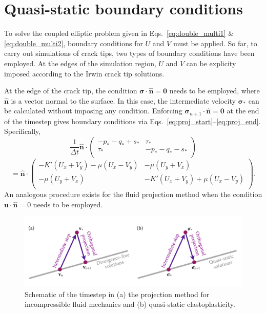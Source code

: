 \documentclass[11pt]{article}
\newcommand{\bsig}{\boldsymbol\sigma}
\renewcommand{\vec}[1]{\mathbf{#1}}
\newcommand{\vnor}{\hat{\vec{n}}}
\begin{document}
\section*{Quasi-static boundary conditions}
To solve the coupled elliptic problem given in Eqs.~\ref{eq:double_multi1} \&
\ref{eq:double_multi2}, boundary conditions for $U$ and $V$ must be applied.
So far, to carry out simulations of crack tips, two types of boundary conditions
have been employed. At the edges of the simulation region, $U$ and $V$ can
be explicity imposed according to the Irwin crack tip solutions.

At the edge of the crack tip, the condition $\bsig\cdot \vnor=\vec{0}$ needs to
be employed, where $\vnor$ is a vector normal to the surface. In this case, the
intermediate velocity $\bsig_*$ can be calculated without imposing any
condition. Enforcing $\bsig_{n+1} \cdot \vnor=\vec{0}$ at the end of the 
timestep gives boundary conditions via
Eqs.~\ref{eq:proj_start}--\ref{eq:proj_end}. Specifically,
\[
  \frac{1}{\Delta t} \hat{\vec{n}} \cdot
\left(
\begin{array}{cc}
  -p_*-q_* + s_* & \tau_* \\
  \tau_* & -p_*-q_* -s_* \\
\end{array}
\right)
\]
\begin{equation}
  =\hat{\vec{n}} \cdot
\left(
\begin{array}{cc}
  -K'(U_x+V_y) - \mu(U_x-V_y) & -\mu(U_y+V_x) \\
  -\mu(U_y+V_x) & -K'(U_x+V_y) +\mu(U_x-V_y) \\
\end{array}
\right).
\end{equation}
An analogous procedure exists for the fluid projection method when the condition
$\vec{u}\cdot\vnor=0$ needs to be employed.

\begin{figure}
  \centering
  \includegraphics[width=\textwidth]{proj_diagram}
  \caption{Schematic of the timestep in (a) the projection method for
  incompressible fluid mechanics and (b) quasi-static
  elastoplasticity.\label{fig:ortho}}
\end{figure}
\end{document}
